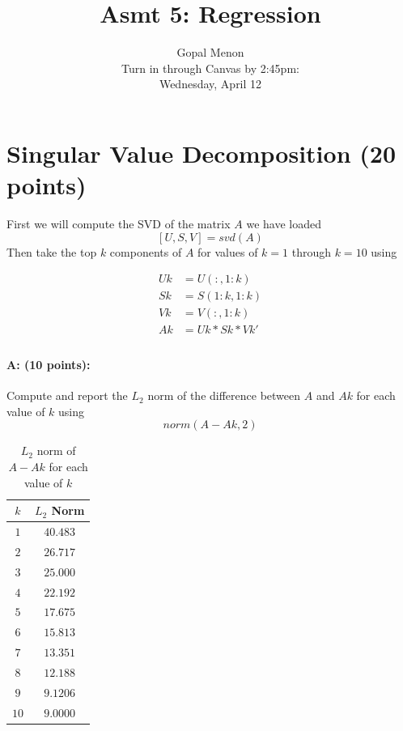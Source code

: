 \documentclass[11pt]{article}
\title{Asmt 5: Regression}
\author{Gopal Menon\\Turn in through Canvas by 2:45pm: \\
Wednesday, April 12}
\date{}
\begin{document}
\maketitle


%
\section{Singular Value Decomposition (20 points)}
First we will compute the SVD of the matrix $A$ we have loaded
$$
[U,S,V] = svd(A)
$$
Then take the top $k$ components of $A$ for values of $k = 1$ through $k=10$ using

\begin{equation*}
\begin{aligned}
Uk &= U(:,1:k)\\
Sk &= S(1:k,1:k)\\
Vk &= V(:,1:k)\\
Ak &= Uk*Sk*Vk'\\
\end{aligned}
\end{equation*}

\paragraph{A: (10 points):} 
Compute and report the $L_2$ norm of the difference between $A$ and $Ak$ for each value of $k$ using
$$
norm(A-Ak,2)
$$

    \begin{table}[!h] 
    \centering
    \caption{$L_2$ norm of $A-Ak$ for each value of $k$}
    \label{AAkL2}
    \begin{tabular}{|c|c|}
      \hline
   $k$  & $L_2$ Norm  \\
      \hline      
      $1$ &      $40.483$  \\
      \hline
      $2$ &      $26.717$  \\
      \hline
      $3$ &      $25.000$  \\
      \hline
      $4$ &      $22.192$  \\
      \hline
      $5$ &      $17.675$  \\
      \hline
      $6$ &      $15.813$  \\
      \hline
      $7$ &      $13.351$  \\
      \hline
      $8$ &      $12.188$  \\
      \hline
      $9$ &      $9.1206$  \\
      \hline
      $10$ &      $9.0000$  \\
      \hline
    \end{tabular}
\end{table}
\end{document}
